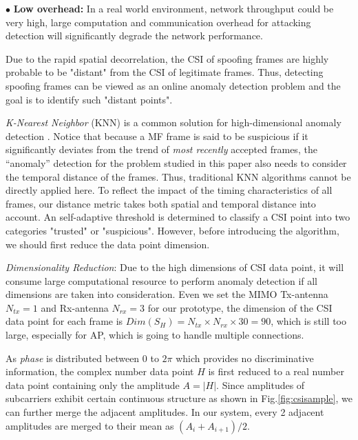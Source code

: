 \documentclass[conference]{IEEEtran}
\begin{document}
$\bullet$ \textbf{Low overhead:}
 In a real world environment, network throughput could be very high,
 large computation and communication overhead for attacking detection
 will significantly degrade the network performance.




 Due to the rapid spatial decorrelation, the CSI of spoofing frames are
  highly probable to be "distant" from the CSI of legitimate frames.
 Thus, detecting spoofing frames can be viewed as an online
  anomaly detection problem and the goal is to identify such "distant
  points".



\textit{K-Nearest Neighbor} (KNN) \cite{hautamaki2004outlier} is a common solution for
high-dimensional anomaly detection \cite{aggarwal2001outlier}.
Notice that because a MF frame is said to be suspicious if it
 significantly deviates from the trend of \emph{most recently} accepted
 frames, the ``anomaly'' detection for the problem studied in this paper
 also needs to consider the temporal distance of the frames.
Thus, traditional KNN algorithms cannot be directly applied here.
To reflect the impact of the timing characteristics of all frames, our distance metric takes both spatial and temporal distance into account. An self-adaptive threshold is determined to classify a CSI point into two categories "trusted" or "suspicious".
However, before introducing the algorithm, we should first reduce the data point dimension.

\medskip

\textit{Dimensionality Reduction}:
Due to the high dimensions of CSI data point, it will consume large computational resource to perform anomaly detection if all dimensions are taken into consideration.
Even we set the MIMO Tx-antenna $N_{tx}=1$ and Rx-antenna $N_{rx}=3$ for
 our prototype, the dimension of the CSI data point for each frame is  $Dim(S_H)=N_{tx}\times N_{rx}\times 30=90$,
 which is still too large, especially for AP, which is going to handle multiple connections.

As \textit{phase} is distributed between $0$ to $2\pi$ which provides no discriminative information, the complex number data
point $H$ is first reduced to a real number data point containing only
the amplitude $ A=\vert H \vert$.
Since amplitudes of subcarriers exhibit certain continuous structure as shown in Fig.\ref{fig:csisample},
 we can further merge the adjacent amplitudes.
In our system, every 2 adjacent amplitudes are merged to their mean as $(A_i
 +A_{i+1})/2$.
\end{document}

